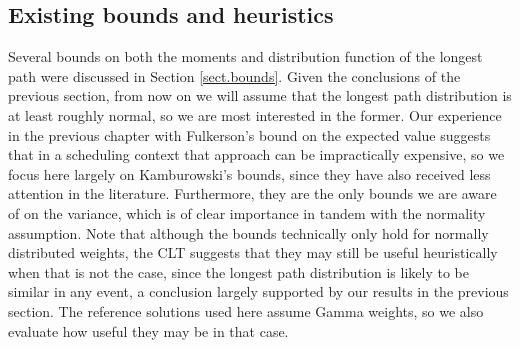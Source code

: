 \documentclass[12pt]{article}
\begin{document}

\subsection{Existing bounds and heuristics}
\label{subsect.results_existing}

Several bounds on both the moments and distribution function of the longest path were discussed in Section \ref{sect.bounds}. Given the conclusions of the previous section, from now on we will assume that the longest path distribution is at least roughly normal, so we are most interested in the former. Our experience in the previous chapter with Fulkerson's bound on the expected value suggests that in a scheduling context that approach can be impractically expensive, so we focus here largely on Kamburowski's bounds, since they have also received less attention in the literature. Furthermore, they are the only bounds we are aware of on the variance, which is of clear importance in tandem with the normality assumption. Note that although the bounds technically only hold for normally distributed weights, the CLT suggests that they may still be useful heuristically when that is not the case, since the longest path distribution is likely to be similar in any event, a conclusion largely supported by our results in the previous section. The reference solutions used here assume Gamma weights, so we also evaluate how useful they may be in that case.
\end{document}
